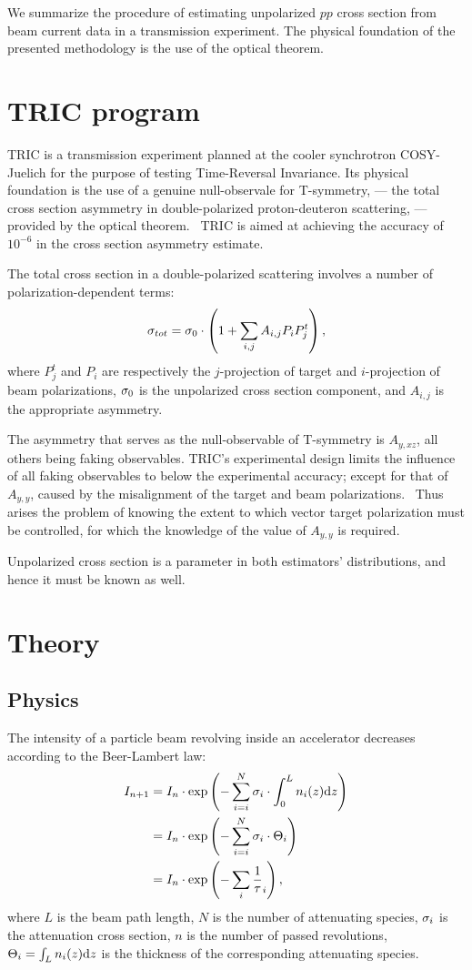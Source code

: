 \documentclass[reprint]{revtex4-1}
\newcommand{\td}{\mathrm{d}}
\begin{document}
\begin{abstractname}
We summarize the procedure of estimating unpolarized $pp$ cross section from beam current data in a transmission experiment. The  physical foundation of the presented methodology is the use of the optical theorem.
\end{abstractname}

\section{TRIC program}

TRIC is a transmission experiment planned at the cooler synchrotron COSY-Juelich for the purpose of testing Time-Reversal Invariance. Its physical foundation is the use of a genuine null-observale for T-symmetry, --- the total cross section asymmetry in double-polarized proton-deuteron scattering, --- provided by the optical theorem.~\cite{Conzett} TRIC is aimed at achieving the accuracy of $10^{-6}$ in the cross section asymmetry estimate.

The total cross section in a double-polarized scattering involves a number of polarization-dependent terms:
\[
	\CS[tot] = \CS[0]\cdot\bkt{1 + \sum_{i,j} A_{i,j} P_iP^t_j},
\]
where $P^t_j$ and $P_i$ are respectively the $j$-projection of target and $i$-projection of beam polarizations, $\CS[0]$ is the unpolarized cross section component, and $A_{i,j}$ is the appropriate asymmetry.

The asymmetry that serves as the null-observable of T-symmetry is $A_{y,xz}$, all others being faking observables. TRIC's experimental design limits the influence of all faking observables to below the experimental accuracy; except for that of $A_{y,y}$, caused by the misalignment of the target and beam polarizations.~\cite[p. 11]{Proposal} Thus arises the problem of knowing the extent to which vector target polarization must be controlled, for which the knowledge of the value of $A_{y,y}$ is required. 

Unpolarized cross section is a parameter in both estimators' distributions, and hence it must be known as well. 

\section{Theory}
\subsection{Physics}
The intensity of a particle beam revolving inside an accelerator decreases according to the Beer-Lambert law:
\begin{align*}
	I_{n+1} &= I_n \cdot \exp\bkt{-\sum_{i=i}^N \CS[i]\cdot\int_0^L n_i(z)\td z} \\
			&= I_n \cdot \exp\bkt{-\sum_{i=i}^N \CS[i]\cdot \Thick[i]} \\
			&= I_n \cdot \exp\bkt{-\sum_i\frac1\tau_i},
\end{align*}
where $L$ is the beam path length, $N$ is the number of attenuating species, $\CS[i]$ is the attenuation cross section, $n$ is the number of passed revolutions, $\Thick[i] = \int_L n_i(z)\td z$ is the thickness of the corresponding attenuating species.
\end{document}
